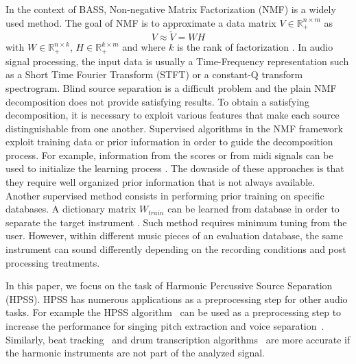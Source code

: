 \documentclass{article}
\begin{document}
In the context of BASS, Non-negative Matrix Factorization (NMF) is a widely used method. The goal of NMF is to approximate a data matrix $V \in \mathbb{R}_{+}^{n \times m} $ as 
\begin{equation}\label{modelNMF}
V \approx \tilde{V} = WH
\end{equation}
with $W \in \mathbb{R}_{+}^{n \times k}$, $H \in \mathbb{R}_{+}^{k \times m}$ and where $k$ is the rank of factorization \cite{lee99}. In audio signal processing, the input data is usually a Time-Frequency representation such as a Short Time Fourier Transform (STFT) or a constant-Q transform spectrogram. Blind source separation is a difficult problem and the plain NMF decomposition does not provide satisfying results. To obtain a satisfying decomposition, it is necessary to exploit various features that make each source distinguishable from one another. 
Supervised algorithms in the NMF framework exploit training data or prior information in order to guide the decomposition process. For example, information from the scores or from midi signals can be used to initialize the learning process \cite{EwertM12}. The downside of these approaches is that they require well organized prior information that is not always available. Another supervised method consists in performing prior training on specific databases. A dictionary matrix $W_{train}$ can be learned from database in order to separate the target instrument \cite{jaureguiberry2011adaptation,wudrum}. Such method requires minimum tuning from the user.  However, within different music pieces of an evaluation database, the same instrument can sound differently depending on the recording conditions and post processing treatments. %


In this paper, we focus on the task of Harmonic Percussive Source Separation (HPSS). HPSS has numerous applications as a preprocessing step for other audio tasks. For example the HPSS algorithm~\cite{fitzgerald2010harmonic} can be used as a preprocessing step to increase the performance for singing pitch extraction and voice separation~\cite{hsu2012tandem}. 
Similarly, beat tracking~\cite{ellis2007beat} and drum transcription algorithms~\cite{paulus2005drum} are more accurate if the harmonic instruments are not part of the analyzed signal. 
\end{document}
